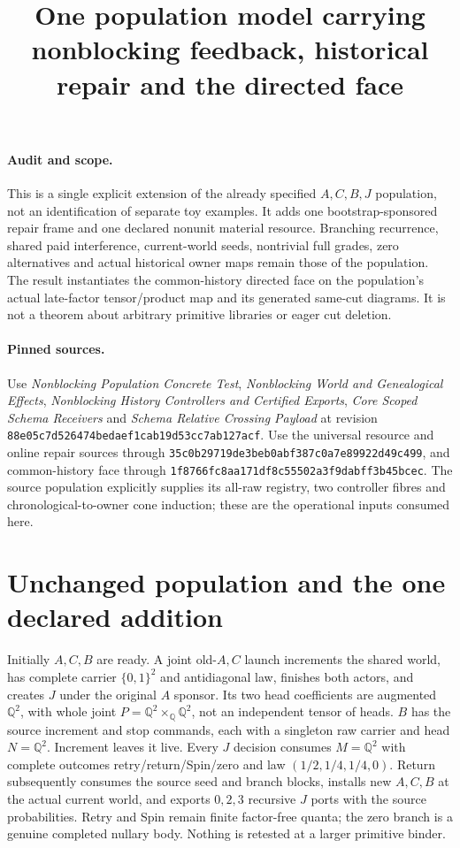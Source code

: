\documentclass{article}
\title{One population model carrying nonblocking feedback, historical repair and the directed face}
\author{}\date{}
\begin{document}
\maketitle
\paragraph{Audit and scope.}
This is a single explicit extension of the already specified $A,C,B,J$ population, not an identification of separate toy examples. It adds one bootstrap-sponsored repair frame and one declared nonunit material resource. Branching recurrence, shared paid interference, current-world seeds, nontrivial full grades, zero alternatives and actual historical owner maps remain those of the population. The result instantiates the common-history directed face on the population's actual late-factor tensor/product map and its generated same-cut diagrams. It is not a theorem about arbitrary primitive libraries or eager cut deletion.

\paragraph{Pinned sources.}
Use \emph{Nonblocking Population Concrete Test}, \emph{Nonblocking World and Genealogical Effects}, \emph{Nonblocking History Controllers and Certified Exports}, \emph{Core Scoped Schema Receivers} and \emph{Schema Relative Crossing Payload} at revision \texttt{88e05c7d526474bedaef1cab19d53cc7ab127acf}. Use the universal resource and online repair sources through \texttt{35c0b29719de3beb0abf387c0a7e89922d49c499}, and common-history face through \texttt{1f8766fc8aa171df8c55502a3f9dabff3b45bcec}. The source population explicitly supplies its all-raw registry, two controller fibres and chronological-to-owner cone induction; these are the operational inputs consumed here.

\section{Unchanged population and the one declared addition}
Initially $A,C,B$ are ready. A joint old-$A,C$ launch increments the shared world, has complete carrier $\{0,1\}^2$ and antidiagonal law, finishes both actors, and creates $J$ under the original $A$ sponsor. Its two head coefficients are augmented $\mathbb Q^2$, with whole joint $P=\mathbb Q^2\times_{\mathbb Q}\mathbb Q^2$, not an independent tensor of heads. $B$ has the source increment and stop commands, each with a singleton raw carrier and head $N=\mathbb Q^2$. Increment leaves it live. Every $J$ decision consumes $M=\mathbb Q^2$ with complete outcomes retry/return/Spin/zero and law $(1/2,1/4,1/4,0)$. Return subsequently consumes the source seed and branch blocks, installs new $A,C,B$ at the actual current world, and exports $0,2,3$ recursive $J$ ports with the source probabilities. Retry and Spin remain finite factor-free quanta; the zero branch is a genuine completed nullary body. Nothing is retested at a larger primitive binder.
\end{document}
